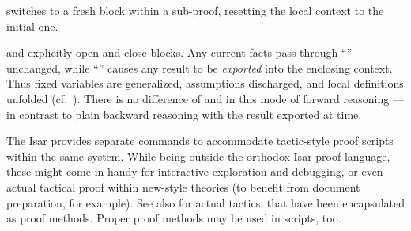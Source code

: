 \begin{isabellebody}
\begin{isamarkuptext}
\begin{descr}
  \item [\mbox{\isa{\isacommand{next}}}] switches to a fresh block within a
  sub-proof, resetting the local context to the initial one.

  \item [\mbox{\isa{\isacommand{{\isacharbraceleft}}}} and \mbox{\isa{\isacommand{{\isacharbraceright}}}}] explicitly open and close
  blocks.  Any current facts pass through ``\mbox{\isa{\isacommand{{\isacharbraceleft}}}}''
  unchanged, while ``\mbox{\isa{\isacommand{{\isacharbraceright}}}}'' causes any result to be
  \emph{exported} into the enclosing context.  Thus fixed variables
  are generalized, assumptions discharged, and local definitions
  unfolded (cf.\ ).  There is no difference
  of \mbox{} and \mbox{} in this mode of
  forward reasoning --- in contrast to plain backward reasoning with
  the result exported at \mbox{} time.

  \end{descr}%
\end{isamarkuptext}%
\isamarkuptrue%
%
\isamarkuptrue%
%
\begin{isamarkuptext}%
The Isar provides separate commands to accommodate tactic-style
  proof scripts within the same system.  While being outside the
  orthodox Isar proof language, these might come in handy for
  interactive exploration and debugging, or even actual tactical proof
  within new-style theories (to benefit from document preparation, for
  example).  See also  for actual tactics, that
  have been encapsulated as proof methods.  Proper proof methods may
  be used in scripts, too.


\end{isamarkuptext}
\end{isabellebody}
